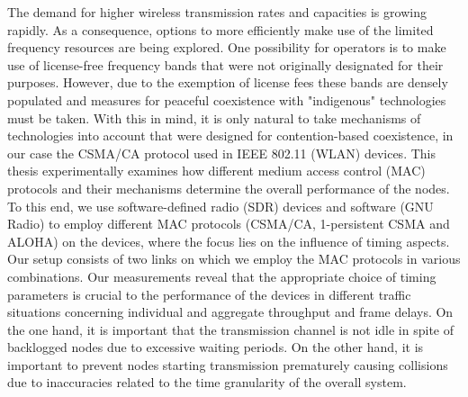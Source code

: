 The demand for higher wireless transmission rates and capacities is growing rapidly. As a consequence, options to more efficiently make use of the limited frequency resources are being explored. One possibility for operators is to make use of license-free frequency bands that were not originally designated for their purposes. However, due to the exemption of license fees these bands are densely populated and measures for peaceful coexistence with "indigenous" technologies must be taken. With this in mind, it is only natural to take mechanisms of technologies into account that were designed for contention-based coexistence, in our case the CSMA/CA protocol used in IEEE 802.11 (WLAN) devices. 
This thesis experimentally examines how different medium access control (MAC) protocols and their mechanisms determine the overall performance of the nodes. To this end, we use software-defined radio (SDR) devices and software (GNU Radio) to employ different MAC protocols (CSMA/CA, 1-persistent CSMA and ALOHA) on the devices, where the focus lies on the influence of timing aspects. Our setup consists of two links on which we employ the MAC protocols in various combinations.
Our measurements reveal that the appropriate choice of timing parameters is crucial to the performance of the devices in different traffic situations concerning individual and aggregate throughput and frame delays. On the one hand, it is important that the transmission channel is not idle in spite of backlogged nodes due to excessive waiting periods. On the other hand, it is important to prevent nodes starting transmission prematurely causing collisions due to inaccuracies related to the time granularity of the overall system.  